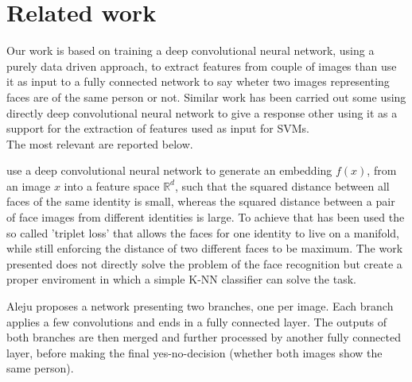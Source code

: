 \section{Related work}
Our work is based on training a deep convolutional neural network, using a purely data driven approach, to extract features from couple of images than use it as input to a fully connected network to say wheter two images representing faces are of the same person or not.
Similar work has been carried out some using directly deep convolutional neural network to give a response other using it as a support for the extraction of features used as input for SVMs.
\\
The most relevant are reported below.
\\
\par
  use a deep convolutional neural network to generate an embedding $f(x)$, from an image $x$ into a feature space $\mathbb{R}^d$, such that the squared distance between all faces of the same identity is small, whereas the squared distance between a pair of face images from different identities is large. To achieve that has been used the so called 'triplet loss' that allows the faces for one identity to live on a manifold, while still enforcing the distance of two different faces to be maximum.
The work presented does not directly solve the problem of the face recognition but create a proper enviroment in which a simple K-NN classifier can solve the task.
\\
\par
Aleju \cite{aleju} proposes a network presenting two branches, one per image. Each branch applies a few convolutions and ends in a fully connected layer. The outputs of both branches are then merged and further processed by another fully connected layer, before making the final yes-no-decision (whether both images show the same person).
